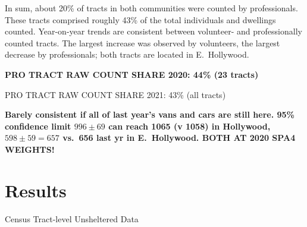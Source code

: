 \documentclass[11pt,twocolumn]{article}
\def\bfr{\bf\color{red}}
\begin{document}
In sum, about 20\% of tracts in both communities were counted by professionals. These tracts comprised
roughly 43\% of the total individuals and dwellings counted. Year-on-year trends are consistent between
volunteer- and professionally counted tracts. The largest increase was observed by volunteers, the largest
decrease by professionals; both tracts are located in E.~Hollywood.

{\bfr PRO TRACT RAW COUNT SHARE 2020: 44\% (23 tracts)

PRO TRACT RAW COUNT SHARE 2021: 43\% (all tracts)}

{\bfr Barely consistent if all of last year's vans and cars are still here. 95\% confidence limit $996\pm69$ can reach 1065 (v 1058) 
in Hollywood, $598\pm 59= 657$ vs.\ 656 last yr in E.~Hollywood. BOTH AT 2020 SPA4 WEIGHTS!}


\section{Results}
\label{sec:results}

\begin{table}[]
\caption{Census Tract-level Unsheltered Data}
\caption*{\bfr this is a placeholder table}
\label{tbl:tractStats}
\end{table}
\end{document}
